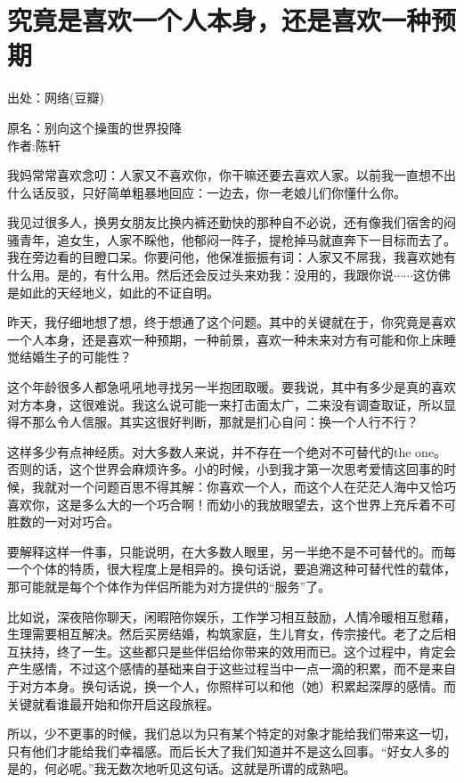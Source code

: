 \chapter{究竟是喜欢一个人本身，还是喜欢一种预期}

出处：网络(豆瓣)\cite{love}


\begin{center}
原名：别向这个操蛋的世界投降\\ 作者:陈轩 
\end{center}

我妈常常喜欢念叨：人家又不喜欢你，你干嘛还要去喜欢人家。以前我一直想不出什么话反驳，只好简单粗暴地回应：一边去，你一老娘儿们你懂什么你。

我见过很多人，换男女朋友比换内裤还勤快的那种自不必说，还有像我们宿舍的闷骚青年，追女生，人家不睬他，他郁闷一阵子，提枪掉马就直奔下一目标而去了。我在旁边看的目瞪口呆。你要问他，他保准振振有词：人家又不屌我，我喜欢她有什么用。是的，有什么用。然后还会反过头来劝我：没用的，我跟你说$\cdots\cdots$这仿佛是如此的天经地义，如此的不证自明。 

昨天，我仔细地想了想，终于想通了这个问题。其中的关键就在于，你究竟是喜欢一个人本身，还是喜欢一种预期，一种前景，喜欢一种未来对方有可能和你上床睡觉结婚生子的可能性？ 

这个年龄很多人都急吼吼地寻找另一半抱团取暖。要我说，其中有多少是真的喜欢对方本身，这很难说。我这么说可能一来打击面太广，二来没有调查取证，所以显得不那么令人信服。其实这很好判断，那就是扪心自问：换一个人行不行？ 

这样多少有点神经质。对大多数人来说，并不存在一个绝对不可替代的the one。否则的话，这个世界会麻烦许多。小的时候，小到我才第一次思考爱情这回事的时候，我就对一个问题百思不得其解：你喜欢一个人，而这个人在茫茫人海中又恰巧喜欢你，这是多么大的一个巧合啊！而幼小的我放眼望去，这个世界上充斥着不可胜数的一对对巧合。 

要解释这样一件事，只能说明，在大多数人眼里，另一半绝不是不可替代的。而每一个个体的特质，很大程度上是相异的。换句话说，要追溯这种可替代性的载体，那可能就是每个个体作为伴侣所能为对方提供的“服务”了。 

比如说，深夜陪你聊天，闲暇陪你娱乐，工作学习相互鼓励，人情冷暖相互慰藉，生理需要相互解决。然后买房结婚，构筑家庭，生儿育女，传宗接代。老了之后相互扶持，终了一生。这些都只是些伴侣给你带来的效用而已。这个过程中，肯定会产生感情，不过这个感情的基础来自于这些过程当中一点一滴的积累，而不是来自于对方本身。换句话说，换一个人，你照样可以和他（她）积累起深厚的感情。而关键就看谁最开始和你开启这段旅程。 

所以，少不更事的时候，我们总以为只有某个特定的对象才能给我们带来这一切，只有他们才能给我们幸福感。而后长大了我们知道并不是这么回事。“好女人多的是的，何必呢。”我无数次地听见这句话。这就是所谓的成熟吧。 

